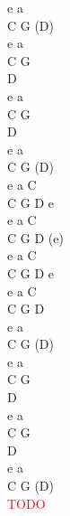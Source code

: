\documentclass[a5paper, 10pt]{book}
\begin{document}
\begin{minipage}[t]{0.4\textwidth}
e a\\
C G (D)\\
e a\\
C G\\
D\\
e a\\
C G\\
D\\
e a\\
C G (D)\\

e a C\\
C G D e\\
e a C\\
C G D (e)\\
e a C\\
C G D e\\
e a C\\
C G D\\

e a\\
C G (D)\\
e a\\
C G\\
D\\
e a\\
C G\\
D\\
e a\\
C G (D)\\

\textcolor{red}{TODO}\\
\end{minipage}

\newpage
\end{document}
